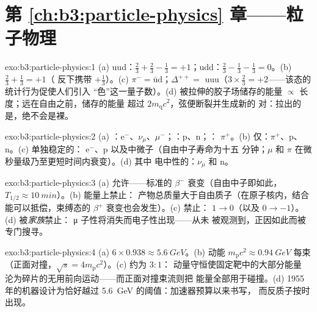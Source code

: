 \section*{第 \ref{ch:b3:particle-physics} 章——粒子物理}

\begin{solution}{exo:b3:particle-physics:1}
(a) uud：$\tfrac23 + \tfrac23 - \tfrac13 = +1$；udd：$\tfrac23 -
\tfrac13 - \tfrac13 = 0$。(b) $\tfrac23 + \tfrac13 = +1$（
反下携带 $+\tfrac13$）。(c) $\pi^- =
\bar{\text{u}}\text{d}$；$\Delta^{++} = $ uuu（$3\times\tfrac23 =
+2$——该态的统计行为促使人们引入
“色”这一量子数）。(d) 被拉伸的胶子场储存的能量
$\propto$ 长度；远在自由之前，储存的能量
超过 $2m_{\text{q}}c^2$，弦便断裂并生成新的
对：拉出的是，绝不会是裸。
\end{solution}

\begin{solution}{exo:b3:particle-physics:2}
(a) ：e$^-$、$\nu_\mu$、$\mu^-$；：p、n；：
$\pi^+$。(b) 仅：$\pi^+$、p、n。(c) 单独稳定的：
e$^-$、p 以及中微子（自由中子寿命为十五
分钟；$\mu$ 和 $\pi$ 在微秒量级乃至更短时间内衰变）。(d) 其中
电中性的：$\nu_\mu$ 和 n。
\end{solution}

\begin{solution}{exo:b3:particle-physics:3}
(a) 允许——标准的 $\beta^-$ 衰变（自由中子即如此，
$T_{1/2} \approx \qty{10}{min}$）。(b) 能量上禁止：
产物总质量大于自由质子（在原子核内，结合
能可以抵偿，束缚态的 $\beta^+$ 衰变也会发生）。(c)
禁止： $1 \to 0$（以及
$0 \to -1$）。(d) 被\emph{家族}禁止：
μ 子性将消失而电子性出现——从未
被观测到，正因如此而被专门搜寻。
\end{solution}

\begin{solution}{exo:b3:particle-physics:4}
(a) $6\times0.938 \approx \qty{5.6}{GeV}$。(b) 动能
$m_{\text{p}}c^2 \approx \qty{0.94}{GeV}$ 每束
（正面对撞，$\sqrt s = 4m_{\text{p}}c^2$）。(c) 约为 $3:1$：
动量守恒使固定靶中的大部分能量
沦为碎片的无用前向运动——而正面对撞束流则把
能量全部用于碰撞。(d) 1955 年的机器设计为恰好越过
\qty{5.6}{GeV} 的阈值：加速器预算以来书写，
而反质子按时出现。
\end{solution}

